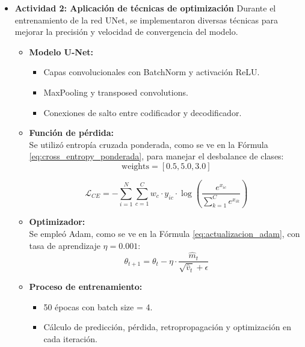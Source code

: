 \begin{enumerate}
\begin{itemize}
  \item\textbf{Actividad 2: Aplicación de técnicas de optimización}
  Durante el entrenamiento de la red UNet, se implementaron diversas técnicas para mejorar la precisión y velocidad de convergencia del modelo.

\begin{itemize}
  \item \textbf{Modelo U-Net:}
  \begin{itemize}
    \item Capas convolucionales con BatchNorm y activación ReLU.
    \item MaxPooling y transposed convolutions.
    \item Conexiones de salto entre codificador y decodificador.
  \end{itemize}
  
  \item \textbf{Función de pérdida:} \\
  Se utilizó entropía cruzada ponderada, como se ve en la Fórmula \ref{eq:cross_entropy_ponderada}, para manejar el desbalance de clases:
  \[
    \text{weights} = [0.5, 5.0, 3.0]
\]

\begin{equation}\label{eq:cross_entropy_ponderada}
  \mathcal{L}_{CE} = - \sum_{i=1}^{N} \sum_{c=1}^{C} w_c \cdot y_{ic} \cdot \log \left( \frac{e^{x_{ic}}}{\sum_{k=1}^{C} e^{x_{ik}}} \right)
\end{equation}

  \item \textbf{Optimizador:} \\
  Se empleó Adam, como se ve en la Fórmula \ref{eq:actualizacion_adam}, con tasa de aprendizaje $\eta = 0.001$:
  \begin{equation}\label{eq:actualizacion_adam}
    \theta_{t+1} = \theta_t - \eta \cdot \frac{\hat{m}_t}{\sqrt{\hat{v}_t} + \epsilon}
\end{equation}

  \item \textbf{Proceso de entrenamiento:}
  \begin{itemize}
    \item 50 épocas con batch size = 4.
    \item Cálculo de predicción, pérdida, retropropagación y optimización en cada iteración.
  \end{itemize}


\end{itemize}
\end{itemize}
\end{enumerate}
